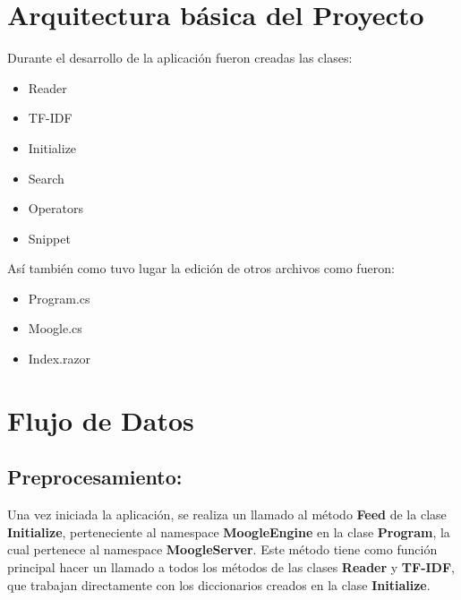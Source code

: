 \documentclass{article}
\begin{document}
\section{Arquitectura básica del Proyecto}
Durante el desarrollo de la aplicación fueron creadas las clases:
\begin{itemize}
	\item Reader
	\item TF-IDF
	\item Initialize
	\item Search
	\item Operators
	\item Snippet
\end{itemize}

\newpage
Así también como tuvo lugar la edición de otros archivos como fueron:
\begin{itemize}
	\item Program.cs
	\item Moogle.cs
	\item Index.razor
\end{itemize}

\section{Flujo de Datos}

\subsection{Preprocesamiento:}

Una vez iniciada la aplicación, se realiza un llamado al método \textbf{Feed} de la clase
\textbf{Initialize}, perteneciente al namespace \textbf{MoogleEngine} en la clase \textbf{Program}, la cual
pertenece al namespace \textbf{MoogleServer}. Este método
tiene como función principal hacer un llamado a todos los métodos de las clases
\textbf{Reader} y \textbf{TF-IDF}, que trabajan directamente con los diccionarios creados en la clase \textbf{Initialize}.
\newline
\newline
\end{document}
